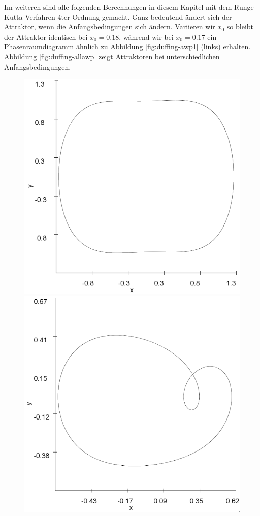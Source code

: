 \documentclass{scrartcl}
\begin{document}
\newline
Im weiteren sind alle folgenden Berechnungen in diesem Kapitel mit dem Runge-Kutta-Verfahren 4ter Ordnung gemacht.
\newline
Ganz bedeutend ändert sich der Attraktor, wenn die Anfangsbedingungen sich ändern. Variieren wir $x_0$ so bleibt der Attraktor identisch bei $x_0=0.18$, während wir bei $x_0=0.17$ ein Phasenraumdiagramm ähnlich zu Abbildung \ref{fig:duffing-awp1} (links) erhalten.
\newline
Abbildung \ref{fig:duffing-allawp} zeigt Attraktoren bei unterschiedlichen Anfangsbedingungen.
\begin{figure}
\includegraphics[scale=0.4]{duffing-awp2-500k-nach-500k-h0,01-runge}
\includegraphics[scale=0.4]{duffing-awp3-500k-nach-500k-h0,01-runge}

\end{figure}
\end{document}
